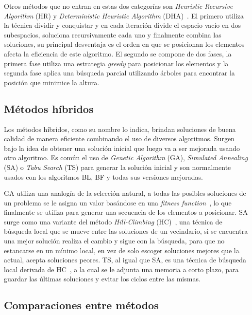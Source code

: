 \documentclass[letter, 10pt]{article}
\begin{document}
Otros m\'etodos que no entran en estas dos categor\'ias son \emph{Heuristic Recursive Algorithm} (HR) y \emph{Deterministic Heuristic Algorithm} (DHA)~\cite{he2013heuristics}. El primero utiliza la t\'ecnica dividir y conquistar y en cada iteraci\'on divide el espacio vac\'io en dos subespacios, soluciona recursivamente cada uno y finalmente combina las soluciones, su principal desventaja es el orden en que se posicionan los elementos afecta la eficiencia de este algoritmo. El segundo se compone de dos fases, la primera fase utiliza una estrategia \emph{greedy} para posicionar los elementos y la segunda fase aplica una b\'usqueda parcial utilizando \'arboles para encontrar la posici\'on que minimice la altura. 

\subsection{M\'etodos h\'ibridos}

Los m\'etodos h\'ibridos, como su nombre lo indica, brindan soluciones de buena calidad de manera eficiente combinando el uso de diversos algoritmos. Surgen bajo la idea de obtener una soluci\'on inicial que luego va a ser mejorada usando otro algoritmo. Es com\'un el uso de \emph{Genetic Algorithm} (GA), \emph{Simulated Annealing} (SA) o \emph{Tabu Search} (TS) para generar la soluci\'on inicial y son normalmente usados con los algoritmos BL, BF y todas sus versiones mejoradas.

GA utiliza una analog\'ia de la selecci\'on natural, a todas las posibles soluciones de un problema se le asigna un valor bas\'andose en una \emph{fitness function}~\cite{thomas2013hybrid}, lo que finalmente se utiliza para generar una secuencia de los elementos a posicionar. SA surge como una variante del m\'etodo \emph{Hill-Climbing} (HC)~\cite{hopper2001empirical}, una t\'ecnica de b\'usqueda local que se mueve entre las soluciones de un vecindario, si se encuentra una mejor soluci\'on realiza el cambio y sigue con la b\'usqueda, para que no estancarse en un m\'inimo local, en vez de solo escoger soluciones mejores que la actual, acepta soluciones peores. TS, al igual que SA, es una t\'ecnica de b\'usqueda local derivada de HC~\cite{wei2011skyline}, a la cual se le adjunta una memoria a corto plazo, para guardar las \'ultimas soluciones y evitar los ciclos entre las mismas.

\subsection{Comparaciones entre m\'etodos}
\end{document}
